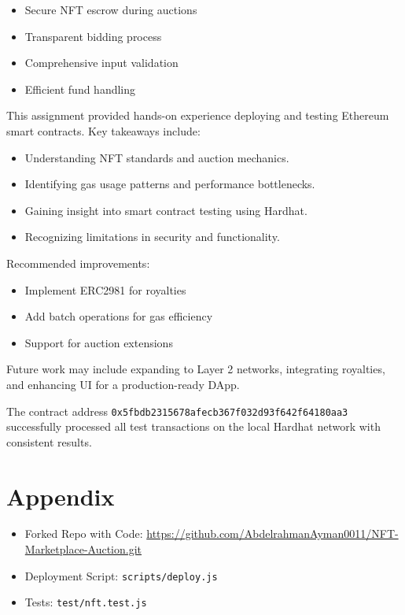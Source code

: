 \documentclass{article}
\begin{document}
\begin{itemize}
    \item Secure NFT escrow during auctions
    \item Transparent bidding process
    \item Comprehensive input validation
    \item Efficient fund handling
\end{itemize}

This assignment provided hands-on experience deploying and testing Ethereum smart contracts. Key takeaways include:

\begin{itemize}
  \item Understanding NFT standards and auction mechanics.
  \item Identifying gas usage patterns and performance bottlenecks.
  \item Gaining insight into smart contract testing using Hardhat.
  \item Recognizing limitations in security and functionality.
\end{itemize}

Recommended improvements:
\begin{itemize}
    \item Implement ERC2981 for royalties
    \item Add batch operations for gas efficiency
    \item Support for auction extensions
\end{itemize}

Future work may include expanding to Layer 2 networks, integrating royalties, and enhancing UI for a production-ready DApp.

The contract address \texttt{0x5fbdb2315678afecb367f032d93f642f64180aa3} successfully processed all test transactions on the local Hardhat network with consistent results.

\section*{Appendix}
\begin{itemize}
  \item Forked Repo with Code: \url{https://github.com/AbdelrahmanAyman0011/NFT-Marketplace-Auction.git}
  \item Deployment Script: \texttt{scripts/deploy.js}
  \item Tests: \texttt{test/nft.test.js}
\end{itemize}
\end{document}
